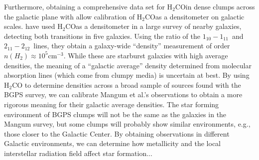 \documentclass[11pt, preprint]{aastex}
\newcommand{\formaldehyde}{H\ensuremath{_2}CO}
\newcommand{\hh}{H\ensuremath{_2}}
\newcommand{\oneone}{\ensuremath{1_{10}-1_{11}}}
\newcommand{\twotwo}{\ensuremath{2_{11}-2_{12}}}
\newcommand{\percc}{\ensuremath{\textrm{cm}^{-3}}}
\begin{document}


Furthermore, obtaining a comprehensive data set for \formaldehyde in dense clumps
across the galactic plane with allow calibration of \formaldehyde as a densitometer on
galactic scales.  \citet{mangum2008} have used \formaldehyde as a densitometer in a
large survey of nearby galaxies, detecting both transitions in five galaxies.
Using the ratio of the \oneone\ and \twotwo\ lines, they obtain a galaxy-wide
``density'' measurement of order $n(\hh)\approx10^5\percc$.  While these are
starburst galaxies with high average densities, the meaning of a ``galactic
average'' density determined from molecular absorption lines (which come from
clumpy media) is uncertain at best.  By using H$_2$CO to determine densities
across a broad sample of sources found with the BGPS survey, we can calibrate
Mangum et al.'s observations to obtain a more rigorous meaning for their
galactic average densities.  The star forming environment of BGPS clumps will
not be the same as the galaxies in the Mangum survey, but some clumps will
probably show similar environments, e.g., those closer to the Galactic Center.
By obtaining observations in different Galactic environments, we can determine
how metallicity and the local interstellar radiation field affect star formation...
\end{document}
